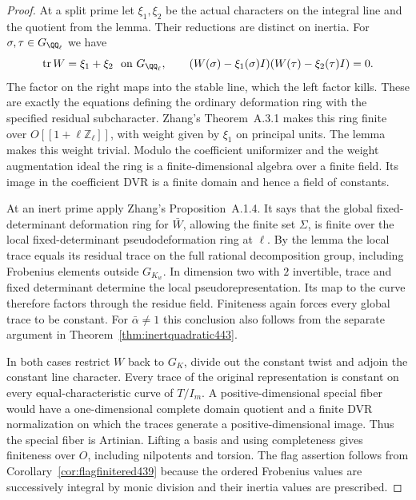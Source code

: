 \documentclass[a4paper,11pt]{article}
\theoremstyle{definition}
\theoremstyle{remark}
\newcommand{\ZZ}{\mathbb Z}\newcommand{\ord}{\operatorname{ord}}
\numberwithin{equation}{section}
\begin{document}
\begin{proof}
At a split prime let \(\xi_1,\xi_2\) be the actual characters
on the integral line and the quotient from the lemma. Their
reductions are distinct on inertia. For \(\sigma,\tau\in
G_{\QQ_\ell}\) we have
\[
  \operatorname{tr}W=\xi_1+\xi_2\ \text{ on }G_{\QQ_\ell},
  \qquad (W(\sigma)-\xi_1(\sigma)I)
         (W(\tau)-\xi_2(\tau)I)=0 .
\]
The factor on the right maps into the stable line, which the
left factor kills. These are exactly the equations defining
the ordinary deformation ring with the specified residual
subcharacter. Zhang's Theorem~A.3.1 makes this ring finite
over \(O[[1+\ell\ZZ_\ell]]\), with weight given by \(\xi_1\)
on principal units. The lemma makes this weight trivial.
Modulo the coefficient uniformizer and the weight augmentation
ideal the ring is a finite-dimensional algebra over a finite
field. Its image in the coefficient DVR is a finite domain
and hence a field of constants.~\cite{XI-VIII-zhang445}

At an inert prime apply Zhang's Proposition~A.1.4. It says
that the global fixed-determinant deformation ring for
\(\bar W\), allowing the finite set \(\Sigma\), is finite over
the local fixed-determinant pseudodeformation ring at \(\ell\).
By the lemma the local trace equals its residual trace on
the full rational decomposition group, including Frobenius
elements outside \(G_{K_w}\). In dimension two with \(2\)
invertible, trace and fixed determinant determine the local
pseudorepresentation. Its map to the curve therefore factors
through the residue field. Finiteness again forces every
global trace to be constant. For \(\bar\alpha\ne1\) this
conclusion also follows from the separate argument in
Theorem~\ref{thm:inertquadratic443}.~\cite{XI-VIII-zhang445}

In both cases restrict \(W\) back to \(G_K\), divide out
the constant twist and adjoin the constant line character.
Every trace of the original representation is constant on
every equal-characteristic curve of \(T/I_m\). A
positive-dimensional special fiber would have a one-dimensional
complete domain quotient and a finite DVR normalization on
which the traces generate a positive-dimensional image.
Thus the special fiber is Artinian. Lifting a basis and
using completeness gives finiteness over \(O\), including
nilpotents and torsion. The flag assertion follows from
Corollary~\ref{cor:flagfinitered439} because the ordered
Frobenius values are successively integral by monic division
and their inertia values are prescribed.
\end{proof}
\end{document}
